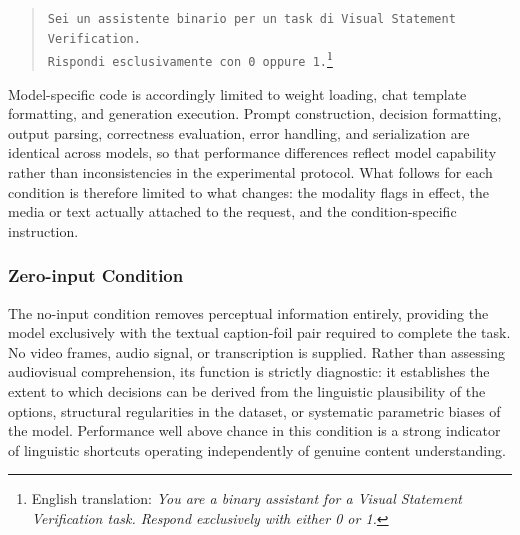 \begin{quote}
\small
\texttt{Sei un assistente binario per un task di Visual Statement Verification.}\\
\texttt{Rispondi esclusivamente con 0 oppure 1.}\footnote{English translation: \textit{You are a binary assistant for a Visual Statement Verification task. Respond exclusively with either 0 or 1.}}
\end{quote}
Model-specific code is accordingly limited to weight loading, chat template formatting, and generation execution. Prompt construction, decision formatting, output parsing, correctness evaluation, error handling, and serialization are identical across models, so that performance differences reflect model capability rather than inconsistencies in the experimental protocol. What follows for each condition is therefore limited to what changes: the modality flags in effect, the media or text actually attached to the request, and the condition-specific instruction.
\subsubsection*{Zero-input Condition}
The no-input condition removes perceptual information entirely, providing the model exclusively with the textual caption-foil pair required to complete the task. No video frames, audio signal, or transcription is supplied. Rather than assessing audiovisual comprehension, its function is strictly diagnostic: it establishes the extent to which decisions can be derived from the linguistic plausibility of the options, structural regularities in the dataset, or systematic parametric biases of the model. Performance well above chance in this condition is a strong indicator of linguistic shortcuts operating independently of genuine content understanding.
